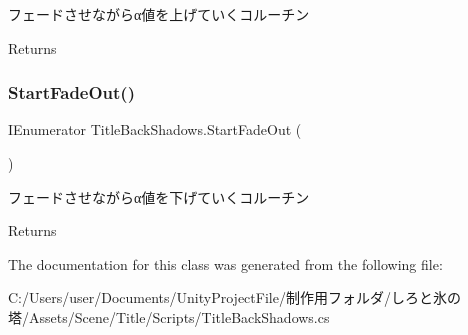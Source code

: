 フェードさせながらα値を上げていくコルーチン 

\begin{DoxyReturn}{Returns}

\end{DoxyReturn}
\mbox{\label{class_title_back_shadows_a124892396b8224c12ee18bc7548a7320}} 
\subsubsection{\texorpdfstring{Start\+Fade\+Out()}{StartFadeOut()}}
{\footnotesize\ttfamily I\+Enumerator Title\+Back\+Shadows.\+Start\+Fade\+Out (\begin{DoxyParamCaption}{ }\end{DoxyParamCaption})\hspace{0.3cm}{\ttfamily [inline]}}



フェードさせながらα値を下げていくコルーチン 

\begin{DoxyReturn}{Returns}

\end{DoxyReturn}


The documentation for this class was generated from the following file\+:\begin{DoxyCompactItemize}
\item 
C\+:/\+Users/user/\+Documents/\+Unity\+Project\+File/制作用フォルダ/しろと氷の塔/\+Assets/\+Scene/\+Title/\+Scripts/Title\+Back\+Shadows.\+cs\end{DoxyCompactItemize}
